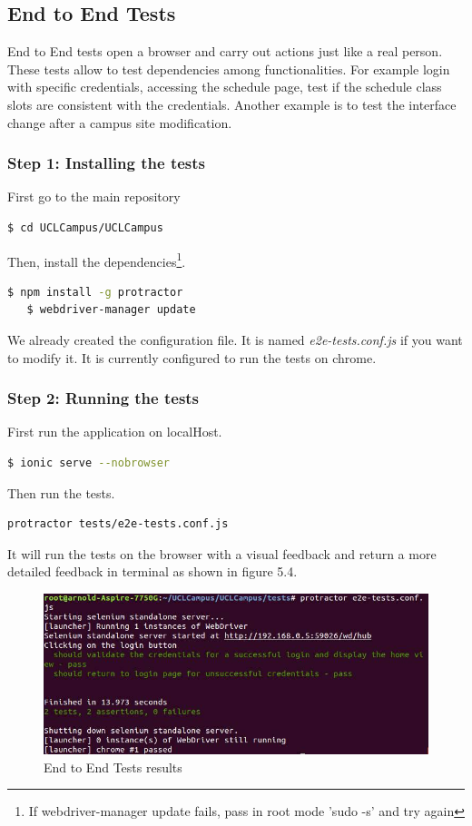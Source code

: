\documentclass{eplmastersthesis}
\begin{document}
\subsection{End to End Tests}

End to End tests open a browser and carry out actions just like a real person. These tests allow to test dependencies among functionalities. For example login with specific credentials, accessing the schedule page, test if the schedule class slots are consistent with the credentials. Another example is to test the interface change after a campus site modification.

\subsubsection{Step 1: Installing the tests}

First go to the main repository
\begin{lstlisting}[language=bash]
   $ cd UCLCampus/UCLCampus
\end{lstlisting}
Then, install the dependencies\footnote{If webdriver-manager update fails, pass in root mode 'sudo -s' and try again}.
\begin{lstlisting}[language=bash]
   $ npm install -g protractor
   $ webdriver-manager update
\end{lstlisting}
We already created the configuration file. It is named\textit{ e2e-tests.conf.js} if you want to modify it. It is currently configured to run the tests on chrome.
\subsubsection{Step 2: Running the tests}
First run the application on localHost.
\begin{lstlisting}[language=bash]
   $ ionic serve --nobrowser
\end{lstlisting}

Then run the tests.

\begin{lstlisting}[language=bash]
   protractor tests/e2e-tests.conf.js
\end{lstlisting}

It will run the tests on the browser with a visual feedback and return a more detailed feedback in terminal as shown in figure 5.4.

\begin{figure}[H]
\centering
\includegraphics[scale = 0.7]{Images/test2.png}
\caption{End to End Tests results}
\end{figure}
\end{document}
